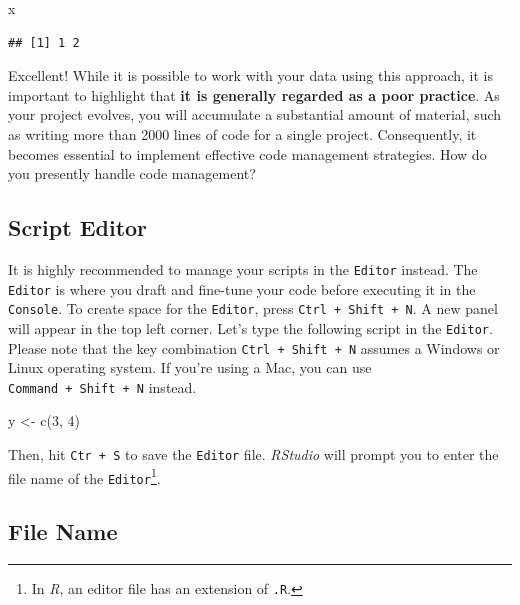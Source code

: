 \documentclass[
]{book}
\newenvironment{Shaded}{\begin{snugshade}}{\end{snugshade}}
\newcommand{\DecValTok}[1]{\textcolor[rgb]{0.00,0.00,0.81}{#1}}
\newcommand{\FunctionTok}[1]{\textcolor[rgb]{0.00,0.00,0.00}{#1}}
\newcommand{\NormalTok}[1]{#1}
\newcommand{\OtherTok}[1]{\textcolor[rgb]{0.56,0.35,0.01}{#1}}
\begin{document}
\begin{Shaded}
\begin{Highlighting}[]
\NormalTok{x}
\end{Highlighting}
\end{Shaded}

\begin{verbatim}
## [1] 1 2
\end{verbatim}

Excellent! While it is possible to work with your data using this approach, it is important to highlight that \textbf{it is generally regarded as a poor practice}. As your project evolves, you will accumulate a substantial amount of material, such as writing more than 2000 lines of code for a single project. Consequently, it becomes essential to implement effective code management strategies. How do you presently handle code management?

\hypertarget{script-editor}{%
\subsection{Script Editor}\label{script-editor}}

It is highly recommended to manage your scripts in the \texttt{Editor} instead. The \texttt{Editor} is where you draft and fine-tune your code before executing it in the \texttt{Console}. To create space for the \texttt{Editor}, press \texttt{Ctrl\ +\ Shift\ +\ N}. A new panel will appear in the top left corner. Let's type the following script in the \texttt{Editor}. Please note that the key combination \texttt{Ctrl\ +\ Shift\ +\ N} assumes a Windows or Linux operating system. If you're using a Mac, you can use \texttt{Command\ +\ Shift\ +\ N} instead.

\begin{Shaded}
\begin{Highlighting}[]
\NormalTok{y }\OtherTok{\textless{}{-}} \FunctionTok{c}\NormalTok{(}\DecValTok{3}\NormalTok{, }\DecValTok{4}\NormalTok{)}
\end{Highlighting}
\end{Shaded}

Then, hit \texttt{Ctr\ +\ S} to save the \texttt{Editor} file. \emph{RStudio} will prompt you to enter the file name of the \texttt{Editor}\footnote{In \emph{R}, an editor file has an extension of \texttt{.R}.}.

\hypertarget{file-name}{%
\subsection{File Name}\label{file-name}}
\end{document}
